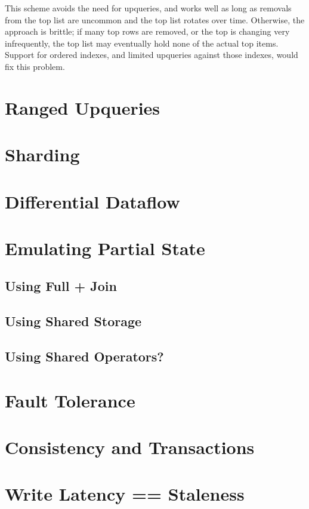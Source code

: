 This scheme avoids the need for upqueries, and works well as long as removals
from the top list are uncommon and the top list rotates over time. Otherwise,
the approach is brittle; if many top rows are removed, or the top is changing
very infrequently, the top list may eventually hold none of the actual top
items. Support for ordered indexes, and limited upqueries against those indexes,
would fix this problem.

\section{Ranged Upqueries}

\section{Sharding}

\section{Differential Dataflow}

\section{Emulating Partial State}

\subsection{Using Full + Join}

\subsection{Using Shared Storage}

\subsection{Using Shared Operators?}

\section{Fault Tolerance}

\section{Consistency and Transactions}

\section{Write Latency == Staleness}

